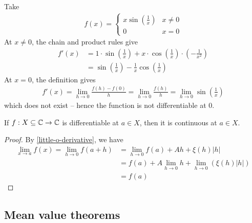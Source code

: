\documentclass{../../template/note}
\begin{document}
    \begin{example*}
        Take
        \begin{align*}
            f(x) = \begin{cases}
                x \sin \left(\frac 1 x\right) & x \neq 0 \\
                0 & x = 0
            \end{cases}
        \end{align*}
        At \(x \neq 0\), the chain and product rules give
        \begin{align*}
            f'(x) &= 1 \cdot \sin\left(\frac 1 x \right) + x \cdot \cos\left(\frac 1 x\right) \cdot \left(-\frac 1 {x^2}\right) \\
            &= \sin \left(\frac 1 x\right) - \frac 1 x \cos\left(\frac 1 x\right)
        \end{align*}
        At \(x = 0\), the definition gives
        \begin{align*}
            f'(x) = \lim_{h \to 0} \frac{f(h)-f(0)}h = \lim_{h \to 0} \frac{f(h)} h = \lim_{h \to 0} \sin \left(\frac 1 x\right)
        \end{align*}
        which does not exist -- hence the function is not differentiable at 0.
    \end{example*}
    
    \begin{lemma}
        \label{diff-cont}
        If \(f: X \subseteq \mathbb C \to \mathbb C\) is differentiable at \(a \in X\), then it is continuous at \(a \in X\).
    \end{lemma}
    
    \begin{proof}
        By \cref{little-o-derivative}, we have
        \begin{align*}
            \lim_{x \to a} f(x) = \lim_{h \to 0} f(a+h) &= \lim_{h \to 0} f(a) + Ah + \xi(h)|h| \\
            &= f(a) + A \lim_{h \to 0} h + \lim_{h \to 0} \left(\xi(h)|h|\right) \\
            &= f(a)
        \end{align*}
    \end{proof}

    
    \subsection{Mean value theorems}
\end{document}
